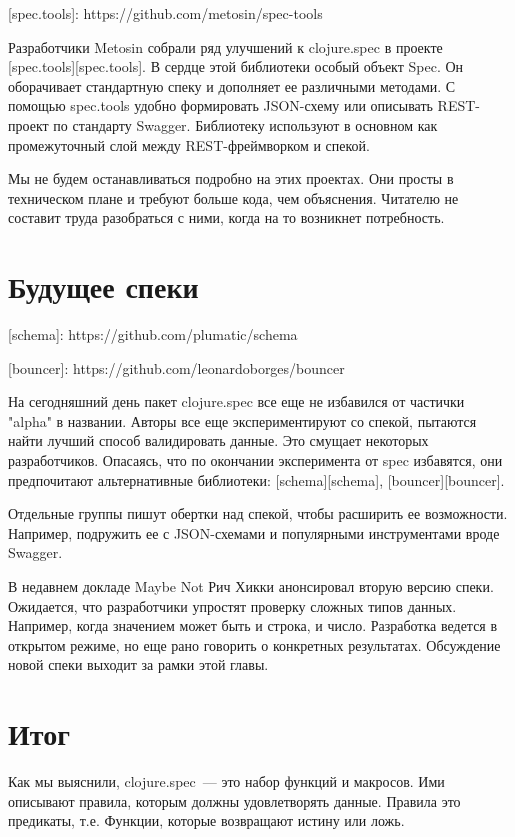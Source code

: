 [spec.tools]: https://github.com/metosin/spec-tools

Разработчики Metosin собрали ряд улучшений к clojure.spec в проекте
[spec.tools][spec.tools]. В сердце этой библиотеки особый объект Spec. Он
оборачивает стандартную спеку и дополняет ее различными методами. С помощью
spec.tools удобно формировать JSON-схему или описывать REST-проект по стандарту
Swagger. Библиотеку используют в основном как промежуточный слой между
REST-фреймворком и спекой.

Мы не будем останавливаться подробно на этих проектах. Они просты в техническом
плане и требуют больше кода, чем объяснения. Читателю не составит труда
разобраться с ними, когда на то возникнет потребность.

\section{Будущее спеки}

[schema]: https://github.com/plumatic/schema

[bouncer]: https://github.com/leonardoborges/bouncer

На сегодняшний день пакет clojure.spec все еще не избавился от частички "alpha"
в названии. Авторы все еще экспериментируют со спекой, пытаются найти лучший
способ валидировать данные. Это смущает некоторых разработчиков. Опасаясь, что
по окончании эксперимента от spec избавятся, они предпочитают альтернативные
библиотеки: [schema][schema], [bouncer][bouncer].

Отдельные группы пишут обертки над спекой, чтобы расширить ее
возможности. Например, подружить ее с JSON-схемами и популярными инструментами
вроде Swagger.

В недавнем докладе Maybe Not Рич Хикки анонсировал вторую версию
спеки. Ожидается, что разработчики упростят проверку сложных типов
данных. Например, когда значением может быть и строка, и число. Разработка
ведется в открытом режиме, но еще рано говорить о конкретных
результатах. Обсуждение новой спеки выходит за рамки этой главы.

\section{Итог}

Как мы выяснили, clojure.spec~--- это набор функций и макросов. Ими описывают
правила, которым должны удовлетворять данные. Правила это предикаты,
т.е. Функции, которые возвращают истину или ложь.

